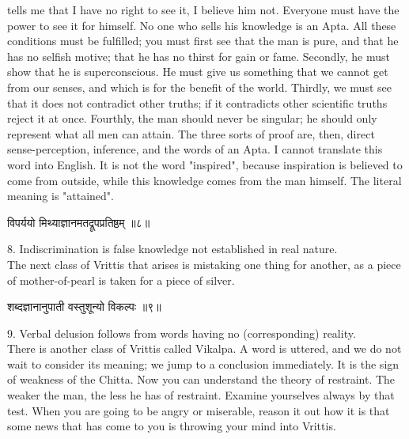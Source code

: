 tells me that I have no right to see it, I believe him not. Everyone
must have the power to see it for himself. No one who sells his
knowledge is an Apta. All these conditions must be fulfilled; you must
first see that the man is pure, and that he has no selfish motive; that
he has no thirst for gain or fame. Secondly, he must show that he is
superconscious. He must give us something that we cannot get from our
senses, and which is for the benefit of the world. Thirdly, we must see
that it does not contradict other truths; if it contradicts other
scientific truths reject it at once. Fourthly, the man
should never be singular; he should only represent what all men can
attain. The three sorts of proof are, then, direct sense-perception,
inference, and the words of an Apta. I cannot translate this word into
English. It is not the word "inspired", because inspiration is believed
to come from outside, while this knowledge comes from the man himself.
The literal meaning is "attained". \\

\begin{center}
\begin{sanskrit}
विपर्ययो मिथ्याज्ञानमतद्रूपप्रतिष्ठम् ॥८॥
\end{sanskrit}
\end{center}
8. Indiscrimination is false knowledge not established in real
nature. \\

The next class of Vrittis that arises is mistaking one thing
for another, as a piece of mother-of-pearl is taken for a piece of
silver. \\

\begin{center}
\begin{sanskrit}
शब्दज्ञानानुपाती वस्तुशून्यो विकल्पः ॥९॥
\end{sanskrit}
\end{center}
9. Verbal delusion follows from words having no
(corresponding) reality. \\

There is another class of Vrittis called Vikalpa. A word is
uttered, and we do not wait to consider its meaning; we jump to a
conclusion immediately. It is the sign of weakness of the Chitta. Now
you can understand the theory of restraint. The weaker the man, the
less he has of restraint. Examine yourselves always by that test. When
you are going to be angry or miserable, reason it out how it is that
some news that has come to you is throwing your mind into Vrittis. \\

